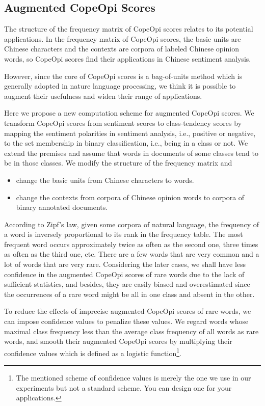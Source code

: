 \subsection{Augmented CopeOpi Scores}
\par The structure of the frequency matrix of CopeOpi scores relates to its potential applications. In the frequency matrix of CopeOpi scores, the basic units are Chinese characters and the contexts are corpora of labeled Chinese opinion words, so CopeOpi scores find their applications in Chinese sentiment analysis.
\par However, since the core of CopeOpi scores is a bag-of-units method which is generally adopted in nature language processing, we think it is possible to augment their usefulness and widen their range of applications.
\par Here we propose a new computation scheme for augmented CopeOpi scores. We transform CopeOpi scores from sentiment scores to class-tendency scores by mapping the sentiment polarities in sentiment analysis, i.e., positive or negative, to the set membership in binary classification, i.e., being in a class or not. We extend the premises and assume that words in documents of some classes tend to be in those classes. We modify the structure of the frequency matrix and
\begin{itemize}
\item change the basic units from Chinese characters to words.
\item change the contexts from corpora of Chinese opinion words to corpora of binary annotated documents.
\end{itemize}


\par According to Zipf's law, given some corpora of natural language, the frequency of a word is inversely proportional to its rank in the frequency table\cite{manning1999nlp}. The most frequent word occurs approximately twice as often as the second one, three times as often as the third one, etc. There are a few words that are very common and a lot of words that are very rare. Considering the later cases, we shall have less confidence in the augmented CopeOpi scores of rare words due to the lack of sufficient statistics, and besides, they are easily biased and overestimated since the occurrences of a rare word might be all in one class and absent in the other.
\par To reduce the effects of imprecise augmented CopeOpi scores of rare words, we can impose confidence values to penalize these values. We regard words whose maximal class frequency less than the average class frequency of all words as rare words, and smooth their augmented CopeOpi scores by multiplying their confidence values which is defined as a logistic function\footnote{The mentioned scheme of confidence values is merely the one we use in our experiments but not a standard scheme. You can design one for your applications.}.
